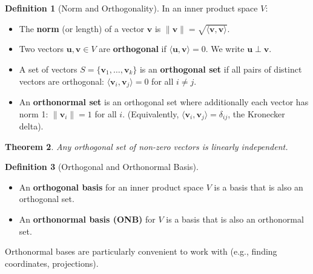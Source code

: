 \documentclass[11pt]{article}
\newtheorem{theorem}{Theorem}[section]
\theoremstyle{definition}
\newtheorem{definition}[theorem]{Definition}
\theoremstyle{remark}
\newcommand{\inner}[2]{\langle #1, #2 \rangle}
\newcommand{\norm}[1]{\| #1 \|}
\newcommand{\ortho}{\perp}
\begin{document}
\begin{definition}[Norm and Orthogonality]
In an inner product space $V$:
\begin{itemize}
    \item The \textbf{norm} (or length) of a vector $\mathbf{v}$ is $\norm{\mathbf{v}} = \sqrt{\inner{\mathbf{v}}{\mathbf{v}}}$.
    \item Two vectors $\mathbf{u}, \mathbf{v} \in V$ are \textbf{orthogonal} if $\inner{\mathbf{u}}{\mathbf{v}} = 0$. We write $\mathbf{u} \ortho \mathbf{v}$.
    \item A set of vectors $S = \{\mathbf{v}_1, \dots, \mathbf{v}_k\}$ is an \textbf{orthogonal set} if all pairs of distinct vectors are orthogonal: $\inner{\mathbf{v}_i}{\mathbf{v}_j} = 0$ for all $i \neq j$.
    \item An \textbf{orthonormal set} is an orthogonal set where additionally each vector has norm 1: $\norm{\mathbf{v}_i} = 1$ for all $i$. (Equivalently, $\inner{\mathbf{v}_i}{\mathbf{v}_j} = \delta_{ij}$, the Kronecker delta).
\end{itemize}
\end{definition}

\begin{theorem}
Any orthogonal set of non-zero vectors is linearly independent.
\end{theorem}

\begin{definition}[Orthogonal and Orthonormal Basis]
\begin{itemize}
    \item An \textbf{orthogonal basis} for an inner product space $V$ is a basis that is also an orthogonal set.
    \item An \textbf{orthonormal basis (ONB)} for $V$ is a basis that is also an orthonormal set.
\end{itemize}
\end{definition}

Orthonormal bases are particularly convenient to work with (e.g., finding coordinates, projections).
\end{document}
